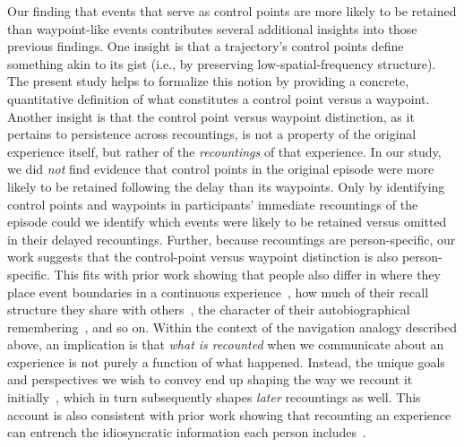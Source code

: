 \documentclass[10pt]{article}
\begin{document}
Our finding that events that serve as control points are more likely to be retained than waypoint-like events contributes several additional insights into those previous findings.
One insight is that a trajectory's control points define something akin to its gist (i.e., by preserving low-spatial-frequency structure).
The present study helps to formalize this notion by providing a concrete, quantitative definition of what constitutes a control point versus a waypoint.
Another insight is that the control point versus waypoint distinction, as it pertains to persistence across recountings, is not a property of the original experience itself, but rather of the \textit{recountings} of that experience.
In our study, we did \textit{not} find evidence that control points in the original episode were more likely to be retained following the delay than its waypoints.
Only by identifying control points and waypoints in participants' immediate recountings of the episode could we identify which events were likely to be retained versus omitted in their delayed recountings.
Further, because recountings are person-specific, our work suggests that the control-point versus waypoint distinction is also person-specific.
This fits with prior work showing that people also differ in where they place event boundaries in a continuous experience~\citep{SavaEtal23}, how much of their recall structure they share with others~\citep{ChenEtal17,NguyEtal19}, the character of their autobiographical remembering~\citep{PaloEtal18}, and so on.
Within the context of the navigation analogy described above, an implication is that \textit{what is recounted} when we communicate about an experience is not purely a function of what happened.
Instead, the unique goals and perspectives we wish to convey end up shaping the way we recount it initially~\citep{TverMars00,Mars07}, which in turn subsequently shapes \textit{later} recountings as well.
This account is also consistent with prior work showing that recounting an experience can entrench the idiosyncratic information each person includes~\citep[i.e., without moving towards a common account;][]{MeleEtal25}.
\end{document}
